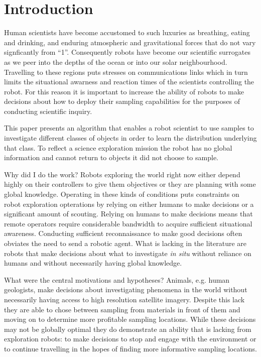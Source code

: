 \section{Introduction}
\label{sec:intro}

Human scientists have become accustomed to such luxuries as breathing, eating
and drinking, and enduring atmospheric and gravitational forces that do not
vary signficantly from ``1''.  Consequently robots have become our scientific
surrogates as we peer into the depths of the ocean or into our solar
neighbourhood.  Travelling to these regions puts stresses on communications
links which in turn limits the situational awarness and reaction times of the
scientists controlling the robot.  For this reason it is important to increase
the ability of robots to make decisions about how to deploy their sampling
capabilities for the purposes of conducting scientific inquiry.

This paper presents an algorithm that enables a robot scientist to use samples
to investigate different classes of objects in order to learn the distribution
underlying that class.  To reflect a science exploration mission the robot has
no global information and cannot return to objects it did not choose to sample.

Why did I do the work?
	Robots exploring the world right now either depend highly on their controllers to give them objectives or they are planning with some global knowledge.  Operating in these kinds of conditions puts constraints on robot exploration opterations by relying on either humans to make decisions or a significant amount of scouting.
	Relying on humans to make decisions means that remote operators require considerable bandwidth to acquire sufficient situational awareness.  Conducting sufficient reconnaissance to make good decisions often obviates the need to send a robotic agent.
	What is lacking in the literature are robots that make decisions about what to investigate \emph{in situ} without reliance on humans and without necessarily having global knowledge.
	
	
What were the central motivations and hypotheses?
	Animals, e.g. human geologists, make decisions about investigating phenomena in the world without necessarily having access to high resolution satellite imagery.  Despite this lack they are able to chose between sampling from materials in front of them and moving on to determine more profitable sampling locations.
	While these decisions may not be globally optimal they do demonstrate an ability that is lacking from exploration robots: to make decisions to stop and engage with the environment or to continue travelling in the hopes of finding more informative sampling locations.



